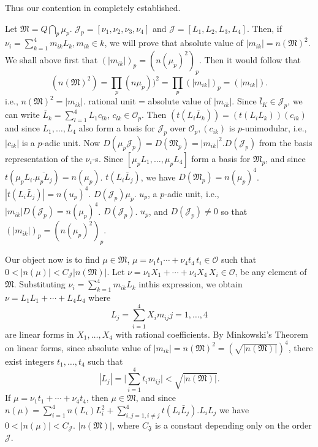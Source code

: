  Thus our contention in completely established. 
 
\begin{proofoflemma}\label{chap1:sec3:polem2}
  Let $\mathfrak{M}= Q \bigcap\limits_{p} \mu_p$. $\mathcal{J}_p =
  [\nu_1, \nu_2, \nu_3,  \nu_4]$ and $\mathcal{J}=
  [L_1, L_2, L_3, L_4]$. Then, if $\nu_i = \sum^4_{k=1}m_{ik} L_k, m_{ik}
  \in k$, we will prove that absolute value of
  $|m_{ik}|=n(\mathfrak{M})^2$. We shall above first that
  $(|m_{ik}|)_p= (n(\mu_p)^2)_p$. Then  it would follow that  
  $$
  (n(\mathfrak{M})^2) = \prod_p (n\mu_p))^2 = \prod_p (|m_{ik}|)_p = (|m_{ik}|).
  $$
  i.e., $n(\mathfrak{M})^2 =|m_{ik}|$. rational unit = absolute value
  of $|m_{ik}|$. Since $\bar{l}_K \in \mathcal{J}_p$, we can write
  $\bar{L}_k = \sum\limits_{l=1}^4 L_1 c_{lk}$, $c_{lk} \in
  \mathscr{O}_p$. Then $(t(L_i \bar{L}_k))=(t( L_i L_k))(c_{ik})$ and
  since $L_1, \ldots,  \bar{L}_4$ also form a basis for
  $\mathcal{J}_p$ over $\mathscr{O}_p, (c_{ik})$ is $p$-unimodular,
  i.e., $|c_{ik}|$ is a $p$-adic unit. Now $D (\mu_p \mathcal{J}_p)=
  D(\mathfrak{M}_p) = |m_{ik}|^2. D(\mathcal{J}_p)$ from  the basis
  representation of the $\nu_i$-s. Since $[\mu_p L_1, \ldots, \mu_p
    L_4]$ form a basis for $\mathfrak{M}_p$, and since $t(\mu_p
  L_i. \overline{\mu_p L_j})= n(\mu_p)$. $t(L_i \bar{L}_j)$, we have
  $D(\mathfrak{M}_p) = n(\mu_p)^4$. $| t (L_i \bar{L}_j) | = n
  (u_p)^4$. $D(\mathcal{J}_p) \mu_p$. $u_p$, a $p$-adic unit, i.e.,
  $|m_{ik}| D(\mathcal{J}_p)=
  n(\mu_p)^4$. $D(\mathcal{J}_p)$. $u_p$, and $D(\mathcal{J}_p) \neq
  0$ so that $(|m_{ik}|)_p= (n(\mu_p)^2)_p$. 
\end{proofoflemma} 
 
Our object now is to find $\mu \in \mathfrak{M}$, $\mu = \nu_1 t_1
\cdots  + \nu_4 t_4 \,t_i \in \mathscr{O}$ such that $0 < |n(\mu) |<
C_\mathcal{J}| n(\mathfrak{M}) |$. Let $\nu= \nu_1 X_1 + \cdots +
\nu_4 X_4 \,X_i \in \mathscr{O}$, be any element of
$\mathfrak{M}$. Substituting $\nu_i= \sum\limits_{k=1}^{4}m_{ik} L_k$
in\pageoriginale this expression, we obtain $\nu= L_1 L_1 + \cdots + L_4 L_4$ where  
 $$
 L_j = \sum_{i=1}^4 X_i m_{ij} j=1, \ldots,  4
 $$
 are linear forms in $X_1, \ldots, X_4$ with rational coefficients. By
 Minkowski's Theorem on linear forms, since absolute value of
 $|m_{ik}|= n(\mathfrak{M})^2=(\sqrt{|n(\mathfrak{M})|})^4$, there
 exist integers $t_1, \ldots, t_4$ such that  
 $$
 |L_j| =\bigg | \sum_{i=1}^4 t_i m_{ij} \bigg | < \sqrt{|n (\mathfrak{M})|}.
 $$
  If $\mu= \nu_1 t_1 +  \cdots + \nu_4 t_4$, then $\mu \in
  \mathfrak{M}$, and since $n(\mu)= \sum_{i=1}^4 n(L_i) L^2_i +
  \sum_{i, j=1, i \neq j}^4 t(L_i \bar{L}_j). L_i L_j$ 
 we have $0  < | n(\mu)| < C_\mathcal{J}$. $| n(\mathfrak{M})|$, where
 $C_\mathfrak{J}$ is a constant depending only on the order
 $\mathcal{J}$. 
 
